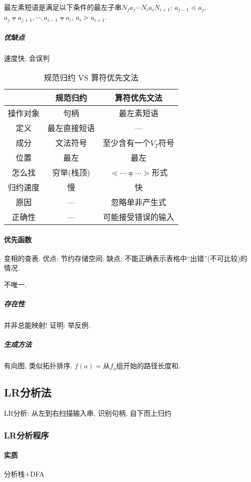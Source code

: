                 \textsf{最左素短语}是满足以下条件的最左子串$N_ja_j\cdots N_ia_iN_{i+1}$: $a_{j-1}\lessdot a_j$, $a_j\eqdot a_{j+1}, \cdots, a_{i-1}\eqdot a_i$, $a_i\gtrdot a_{i+1}$.



            \subparagraph{优缺点}

                速度快, 会误判

                \begin{table}[h!]
                    \centering
                    \caption{规范归约 VS 算符优先文法}
                    \label{tab:gfgyvcsfyx}
                    \begin{tabular}{ccc}\toprule
                        & 规范归约 & 算符优先文法 \\ \midrule
                        操作对象 & 句柄 & 最左素短语 \\
                        定义 & 最左直接短语 & --- \\
                        成分 & 文法符号 & 至少含有一个$V_T$符号 \\
                        位置 & 最左 & 最左 \\
                        怎么找 & 穷举(栈顶) & $\lessdot\cdots\eqdot\cdots\gtrdot$形式 \\
                        归约速度 & 慢 & 快 \\
                        原因 & --- & 忽略单非产生式 \\
                        正确性 & --- & 可能接受错误的输入 \\
                        \bottomrule
                    \end{tabular}
                \end{table}

        \paragraph{优先函数}


            变相的查表. 优点: 节约存储空间; 缺点: 不能正确表示表格中``出错''(不可比较)的情况.

            不唯一.

            \subparagraph{存在性} 并非总能映射! 证明: 举反例.

            \subparagraph{生成方法} 有向图, 类似拓扑排序. $f(a)=$从$f_a$组开始的路径长度和.

    \subsection{LR分析法}

        LR分析: 从左到右扫描输入串, 识别句柄, 自下而上归约

        \subsubsection{LR分析程序}

            \paragraph{实质} 分析栈+DFA
